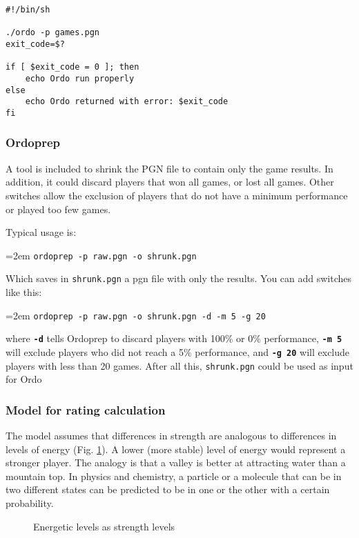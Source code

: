 \documentclass[12pt]{article}
\newcommand{\swtch} [1] {\texttt{\textbf{#1}}}
\newcommand{\filename} [1] {\texttt{#1}}
\newcommand{\cmdln}[1]{
	\par
	\begingroup
		\leftskip=2em
		\addtolength{\rightskip}{0em}
		\noindent \small{\texttt{#1}}
		\par
	\endgroup
}
\begin{document}
\begin{verbatim}
#!/bin/sh

./ordo -p games.pgn
exit_code=$?

if [ $exit_code = 0 ]; then
    echo Ordo run properly
else
    echo Ordo returned with error: $exit_code
fi
\end{verbatim}

\subsubsection*{Ordoprep}
A tool is included to shrink the PGN file to contain only the game results. 
In addition, it could discard players that won all games, or lost all games. 
Other switches allow the exclusion of players that do not have a minimum performance or played too few games.

Typical usage is:

\cmdln{ordoprep -p raw.pgn -o shrunk.pgn}

Which saves in \filename{shrunk.pgn} a pgn file with only the results. 
You can add switches like this:

\cmdln{ordoprep -p raw.pgn -o shrunk.pgn -d -m 5 -g 20}

where \swtch{-d} tells Ordoprep to discard players with 100\% or 0\% performance, \swtch{-m~5}
will exclude players who did not reach a 5\% performance, and \swtch{-g~20} will exclude players with less than 20 games.
After all this, \filename{shrunk.pgn} could be used as input for Ordo

\subsubsection*{Model for rating calculation}

The model assumes that differences in strength are analogous to differences in levels of energy (Fig. \ref{fig:figlevels1}). 
A lower (more stable) level of energy would represent a stronger player.
The analogy is that a valley is better at attracting water than a mountain top. 
In physics and chemistry, a particle or a molecule that can be in two different states can be predicted to be in one or the other with a certain probability.

	\begin{figure}[htb]
	\caption{\label{fig:figlevels1} Energetic levels as strength levels}
	\end{figure}
\end{document}
